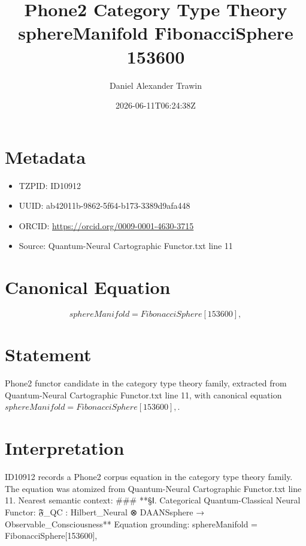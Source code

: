 \documentclass[11pt]{article}
\title{Phone2 Category Type Theory sphereManifold FibonacciSphere 153600}
\author{Daniel Alexander Trawin}
\date{2026-06-11T06:24:38Z}
\begin{document}
\maketitle
\section*{Metadata}
\begin{itemize}
\item TZPID: ID10912
\item UUID: ab42011b-9862-5f64-b173-3389d9afa448
\item ORCID: \url{https://orcid.org/0009-0001-4630-3715}
\item Source: Quantum-Neural Cartographic Functor.txt line 11
\end{itemize}
\section*{Canonical Equation}
\[
sphereManifold = FibonacciSphere[153600],
\]
\section*{Statement}
Phone2 functor candidate in the category type theory family, extracted from Quantum-Neural Cartographic Functor.txt line 11, with canonical equation $sphereManifold = FibonacciSphere[153600],$.
\section*{Interpretation}
ID10912 records a Phone2 corpus equation in the category type theory family. The equation was atomized from Quantum-Neural Cartographic Functor.txt line 11. Nearest semantic context: ### **§Ⅰ. Categorical Quantum-Classical Neural Functor: 𝔉_QC : Hilbert_Neural ⊗ DAANSsphere → Observable_Consciousness** Equation grounding: sphereManifold = FibonacciSphere[153600],
\end{document}
